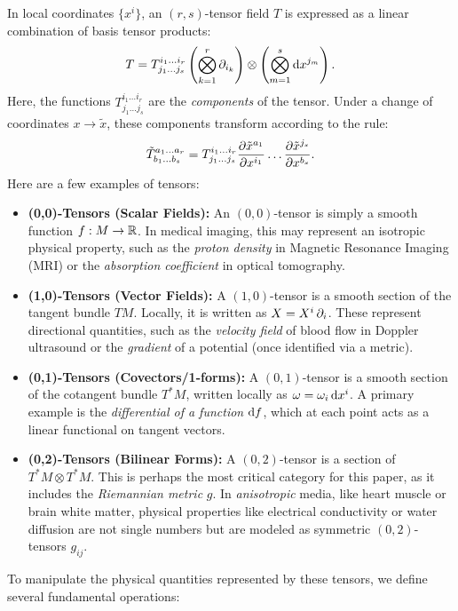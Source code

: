 In local coordinates $\{x^i\}$, an $(r,s)$-tensor field $T$ is expressed as a linear combination of basis tensor products:
\[%
  T = T^{i_1 \dots i_r}_{j_1 \dots j_s} \left(\bigotimes_{k=1}^r \pd{i_k}\right) \otimes \left(\bigotimes_{m=1}^s \dx^{j_m}\right)
.\]%
Here, the functions $T^{i_1 \dots i_r}_{j_1 \dots j_s}$ are the \emph{components} of the tensor. Under a change of coordinates $x \to \tilde{x}$, these components transform according to the rule:
\[%
  \tilde{T}^{a_1 \dots a_r}_{b_1 \dots b_s} = T^{i_1 \dots i_r}_{j_1 \dots j_s} \pdv{\tilde{x}^{a_1}}{x^{i_1}} \dots \pdv{\tilde{x}^{j_s}}{x^{b_s}}
.\]%
Here are a few examples of tensors:
\begin{example}\leavevmode
  \begin{itemize}
    \item \textbf{(0,0)-Tensors (Scalar Fields):} An $(0,0)$-tensor is simply a smooth function $f : M \rightarrow \mathbb{R}$. In medical imaging, this may represent an isotropic physical property, such as the \emph{proton density} in Magnetic Resonance Imaging (MRI) or the \emph{absorption coefficient} in optical tomography.

    \item \textbf{(1,0)-Tensors (Vector Fields):} A $(1,0)$-tensor is a smooth section of the tangent bundle $TM$. Locally, it is written as $X = X^i \pd{i}$. These represent directional quantities, such as the \emph{velocity field} of blood flow in Doppler ultrasound or the \emph{gradient} of a potential (once identified via a metric).

    \item \textbf{(0,1)-Tensors (Covectors/1-forms):} A $(0,1)$-tensor is a smooth section of the cotangent bundle $T^*M$, written locally as $\omega = \omega_i \dx^i$. A primary example is the \emph{differential of a function} $\df$, which at each point acts as a linear functional on tangent vectors.

    \item \textbf{(0,2)-Tensors (Bilinear Forms):} A $(0,2)$-tensor is a section of $T^*M \otimes T^*M$. This is perhaps the most critical category for this paper, as it includes the \emph{Riemannian metric} $g$. In \emph{anisotropic} media, like heart muscle or brain white matter, physical properties like electrical conductivity or water diffusion are not single numbers but are modeled as symmetric $(0,2)$-tensors $g_{ij}$.
  \end{itemize}
\end{example}

To manipulate the physical quantities represented by these tensors, we define several fundamental operations:

